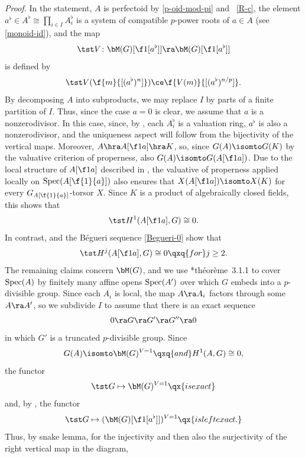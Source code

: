 \emph{Proof.}
In the statement, $A$ is perfectoid by \eqref{p-oid-mod-pi} and ~\ref{R-c}, the element $a^\flat \in A^\flat \cong \prod_{i \in I} A_i^\flat$ is a system of compatible $p$-power roots of $a \in A$ (see \eqref{monoid-id}), and the map
\[
\tst V \colon \bM(G)[\f 1{[a^\flat]}] \ra \bM(G)[\f 1{[a^\flat]}]
\]
is defined by
\[
\tst V(\f{m}{[(a^\flat)^n]}) \ce \f{V(m)}{[(a^\flat)^{n/p}]}.
\]
By decomposing $A$ into subproducts, we may replace $I$ by parts of a finite partition of $I$. Thus, since the case $a = 0$ is clear, we assume that $a$ is a nonzerodivisor. In this case, since, by , each $A_i^\flat$ is a valuation ring, $a^\flat$ is also a nonzerodivisor, and the uniqueness aspect %
will follow from the bijectivity of the vertical maps. Moreover, $A \hra A[\f 1a] \hra K$, so, since $G(A) \isomto G(K)$ by the valuative criterion of properness, %
also $G(A) \isomto G(A[\f 1a])$.
Due to the local structure of $A[\f 1a]$ described in , the valuative of properness applied locally on $\Spec(A[\f{1}{a}])$ also ensures that $X(A[\f 1a]) \isomto X(K)$
for every $G_{A[\f{1}{a}]}$-torsor $X$. Since $K$ is a product of algebraically closed fields, %
this shows that %
\[
\tst H^1(A[\f 1a], G) \cong 0.
\]
In contrast,  and the B\'{e}gueri sequence \eqref{Begueri-0} show that
\[
\tst H^j(A[\f 1a], G) \cong 0 \qxq{for} j \ge 2.
\]
The remaining claims concern $\bM(G)$, and we use \cite{BBM82}*{th\'{e}or\`{e}me~3.1.1} to cover $\operatorname{Spec}(A)$ by finitely many affine opens $\operatorname{Spec}(A')$ over which $G$ embeds into a $p$-divisible group. Since each $A_i$ is local, the map $A \ra A_i$ factors through some $A \ra A'$, so we subdivide $I$ to assume that there is an exact sequence
\begin{equation*} \label{}
\source{purity-flat-cohomology}
0 \ra G \ra G' \ra G'' \ra 0
\end{equation*}
in which $G'$ is a truncated $p$-divisible group. Since
\[
G(A) \isomto \bM(G)^{V = 1} \qxq{and} H^1(A, G) \cong 0,
\]
the functor
\[
\tst G \mapsto \bM(G)^{V = 1} \qx{is exact}
\]
and, by , the functor
\[
\tst G \mapsto (\bM(G)[\f 1{[a^\flat]}])^{V = 1} \qx{is left exact.}
\]
 Thus, by snake lemma, for the injectivity and then also the surjectivity of the right vertical map in the diagram, %
